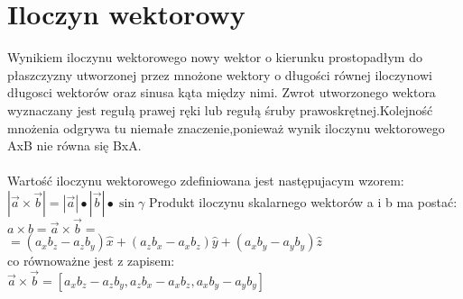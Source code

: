 \section{Iloczyn wektorowy}
Wynikiem iloczynu wektorowego nowy wektor o kierunku prostopadłym do płaszczyzny utworzonej przez mnożone wektory o długości równej iloczynowi długosci wektorów oraz sinusa kąta między nimi. Zwrot utworzonego wektora wyznaczany jest regułą prawej ręki lub regułą śruby prawoskrętnej.Kolejność mnożenia odgrywa tu niemałe znaczenie,ponieważ wynik iloczynu wektorowego AxB nie równa się BxA. \\ \\
Wartość iloczynu wektorowego zdefiniowana jest następujacym wzorem: \\
\centering
$|\vec{a} \times \vec{b}|= |\vec{a}| \bullet |\vec{b}| \bullet \sin\gamma$
\flushleft
Produkt iloczynu skalarnego wektorów a i b ma postać: \\
\centering$a \times b = \vec{a} \times \vec{b} = $\\
$= (a_{x} b_{z} - a_{z} b_{y})\widehat{x} +  (a_{z} b_{x} - a_{x} b_{z})\widehat{y} +  (a_{x} b_{y} - a_{y} b_{y})\widehat{z}$\\\flushleft
co równoważne jest z zapisem: \\
\centering
$ \vec{a} \times \vec{b} = [a_{x} b_{z} - a_{z} b_{y}, a_{z} b_{x} - a_{x} b_{z}, a_{x} b_{y} - a_{y} b_{y}]$
\flushleft
